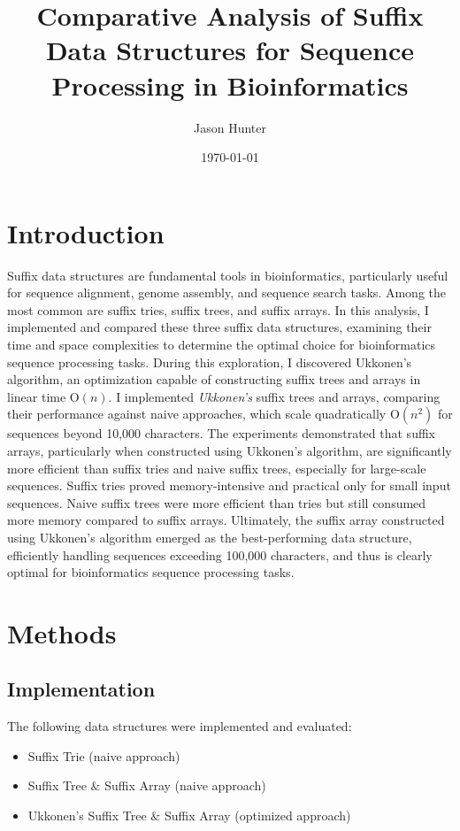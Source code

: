 \documentclass[11pt, letterpaper]{article}
\title{Comparative Analysis of Suffix Data Structures for Sequence Processing in Bioinformatics}
\author{Jason Hunter}
\date{\today}
\begin{document}
\maketitle



\section{Introduction}
Suffix data structures are fundamental tools in bioinformatics, particularly useful for sequence alignment, genome assembly, and sequence search tasks. 
Among the most common are suffix tries, suffix trees, and suffix arrays. 
In this analysis, I implemented and compared these three suffix data structures, examining their time and space complexities to determine the optimal choice for bioinformatics sequence processing tasks. 
During this exploration, I discovered Ukkonen's algorithm, an optimization capable of constructing suffix trees and arrays in linear time O$(n)$. 
I implemented \textit{Ukkonen's} suffix trees and arrays, comparing their performance against naive approaches, which scale quadratically O$(n^2)$ for sequences beyond 10,000 characters. 
The experiments demonstrated that suffix arrays, particularly when constructed using Ukkonen's algorithm, are significantly more efficient than suffix tries and naive suffix trees, especially for large-scale sequences. 
Suffix tries proved memory-intensive and practical only for small input sequences. 
Naive suffix trees were more efficient than tries but still consumed more memory compared to suffix arrays. 
Ultimately, the suffix array constructed using Ukkonen's algorithm emerged as the best-performing data structure, efficiently handling sequences exceeding 100,000 characters, 
and thus is clearly optimal for bioinformatics sequence processing tasks.


\section{Methods}
\subsection{Implementation}
The following data structures were implemented and evaluated:
\begin{itemize}
    \item Suffix Trie (naive approach)
    \item Suffix Tree $\&$ Suffix Array (naive approach)
    \item Ukkonen's Suffix Tree $\&$ Suffix Array (optimized approach)
\end{itemize}
\end{document}
